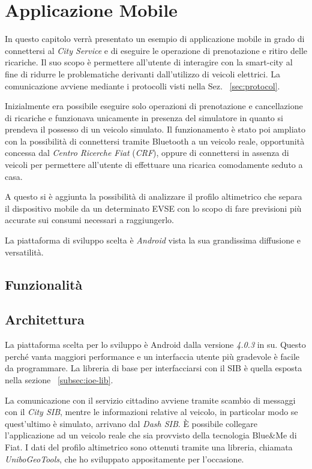 \chapter{Applicazione Mobile}\label{chap:mobile-app}

In questo capitolo verrà presentato un esempio di applicazione mobile in grado di connettersi al \emph{City Service} e di eseguire le operazione di prenotazione e ritiro delle ricariche. Il suo scopo è permettere all'utente di interagire con la smart-city al fine di ridurre le problematiche derivanti dall'utilizzo di veicoli elettrici. La comunicazione avviene mediante i protocolli visti nella Sez. ~\ref{sec:protocol}.

Inizialmente era possibile eseguire solo operazioni di prenotazione e cancellazione di ricariche e funzionava unicamente in presenza del simulatore in quanto si prendeva il possesso di un veicolo simulato. Il funzionamento è stato poi ampliato con la possibilità di connettersi tramite Bluetooth a un veicolo reale, opportunità concessa dal \emph{Centro Ricerche Fiat} (\emph{CRF}), oppure di connettersi in assenza di veicoli per permettere all'utente di effettuare una ricarica comodamente seduto a casa.

A questo si è aggiunta la possibilità di analizzare il profilo altimetrico che separa il dispositivo mobile da un determinato EVSE con lo scopo di fare previsioni più accurate sui consumi necessari a raggiungerlo.

La piattaforma di sviluppo scelta è \emph{Android} vista la sua grandissima diffusione e versatilità.

\section{Funzionalità}



\section{Architettura}

La piattaforma scelta per lo sviluppo è Android dalla versione \emph{4.0.3} in su. Questo perché vanta maggiori performance e un interfaccia utente più gradevole è facile da programmare. La libreria di base per interfacciarsi con il SIB è quella esposta nella sezione ~\ref{subsec:ioe-lib}.

La comunicazione con il servizio cittadino avviene tramite scambio di messaggi con il \emph{City SIB}, mentre le informazioni relative al veicolo, in particolar modo se quest'ultimo è simulato, arrivano dal \emph{Dash SIB}. È possibile collegare l'applicazione ad un veicolo reale che sia provvisto della tecnologia Blue\&{}Me di Fiat. I dati del profilo altimetrico sono ottenuti tramite una libreria, chiamata \emph{UniboGeoTools}, che ho sviluppato appositamente per l'occasione.

